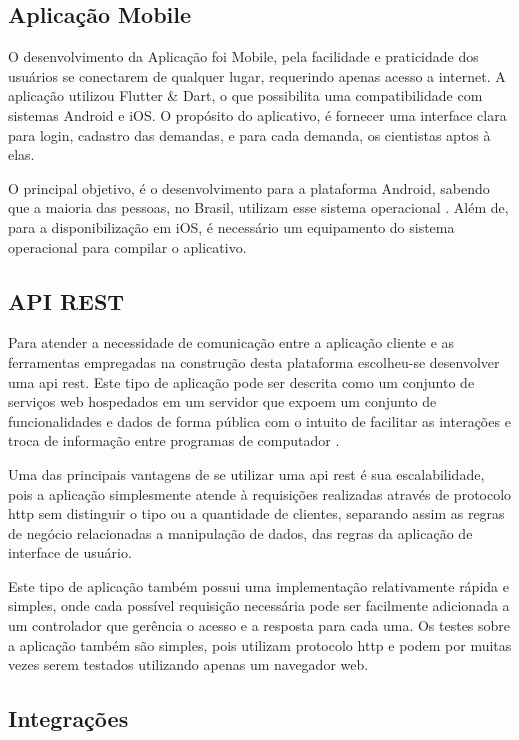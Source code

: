 \subsection{Aplicação Mobile}\label{subsec:app}

O desenvolvimento da Aplicação foi Mobile, pela facilidade e praticidade dos usuários se conectarem de qualquer lugar, requerindo apenas acesso a internet. A aplicação utilizou Flutter {\&} Dart, o que possibilita uma compatibilidade com sistemas Android e iOS. O propósito do aplicativo, é  fornecer uma interface clara para login, cadastro das demandas, e para cada demanda, os cientistas aptos à elas.

O principal objetivo, é o desenvolvimento para a plataforma Android, sabendo que a maioria das pessoas, no Brasil, utilizam esse sistema operacional \cite{StatCounter}. Além de, para a disponibilização em iOS, é necessário um equipamento do sistema operacional para compilar o aplicativo.

\subsection{API REST}\label{subsec:apirest}

Para atender a necessidade de comunicação entre a aplicação cliente e as ferramentas empregadas na construção desta plataforma escolheu-se desenvolver uma \gls{api} \gls{rest}. Este tipo de aplicação pode ser descrita como um conjunto de serviços web hospedados em um servidor que expoem um conjunto de funcionalidades e dados de forma pública com o intuito de facilitar as interações e troca de informação entre programas de computador \cite{RestApiBook}.

Uma das principais vantagens de se utilizar uma \gls{api} \gls{rest} é sua escalabilidade, pois a aplicação simplesmente atende à requisições realizadas através de protocolo \gls{http} sem distinguir o tipo ou a quantidade de clientes, separando assim as regras de negócio relacionadas a manipulação de dados, das regras da aplicação de interface de usuário.

Este tipo de aplicação também possui uma implementação relativamente rápida e simples, onde cada possível requisição necessária pode ser facilmente adicionada a um controlador que gerência o acesso e a resposta para cada uma. Os testes sobre a aplicação também são simples, pois utilizam protocolo \gls{http} e podem por muitas vezes serem testados utilizando apenas um navegador web.

\subsection{Integrações}\label{subsec:integrar}

